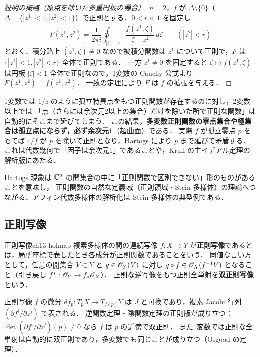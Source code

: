 \begin{proof}[証明の概略（原点を除いた多重円板の場合）]
$n=2$，$f$ が $\Delta\setminus\{0\}$（$\Delta=\{|z^1|<1,|z^2|<1\}$）で正則とする．$0<r<1$ を固定し
\begin{equation}
  F(z^1,z^2) = \frac{1}{2\pi i}\oint_{|\zeta|=r}\frac{f(z^1,\zeta)}{\zeta - z^2}\,d\zeta \qquad(|z^2|<r)
\end{equation}
とおく．積分路上 $(z^1,\zeta)\neq0$ なので被積分関数は $z^1$ について正則で，$F$ は $\{|z^1|<1,|z^2|<r\}$ 全体で正則である．
一方 $z^1\neq0$ を固定すると $\zeta\mapsto f(z^1,\zeta)$ は円板 $|\zeta|<1$ 全体で正則なので，1変数の Cauchy 公式より $F(z^1,z^2)=f(z^1,z^2)$．
一致の定理により $F$ は $f$ の拡張を与える．
\end{proof}

1変数では $1/z$ のように孤立特異点をもつ正則関数が存在するのに対し，2変数以上では
「点（さらには余次元2以上の集合）だけを除いた所で正則な関数」は自動的にそこまで延びてしまう．
この結果，\textbf{多変数正則関数の零点集合や極集合は孤立点にならず，必ず余次元1}（超曲面）である．
実際 $f$ が孤立零点 $p$ をもてば $1/f$ が $p$ を除いて正則となり，Hartogs により $p$ まで延びて矛盾する．
これは代数幾何で「因子は余次元1」であることや，Krull の主イデアル定理の解析版にあたる．

\begin{note}
Hartogs 現象は $\mathbb{C}^n$ の開集合の中に「正則関数で区別できない」形のものがあることを意味し，
正則関数の自然な定義域（正則領域・Stein 多様体）の理論へつながる．アフィン代数多様体の解析化は Stein 多様体の典型例である．
\end{note}

\subsection{正則写像}

\begin{mydef}{正則写像}{ch13-holmap}
複素多様体の間の連続写像 $f:X\to Y$ が\textbf{正則写像}であるとは，局所座標で表したとき各成分が正則関数であることをいう．
同値な言い方として，任意の開集合 $V\subset Y$ と $g\in\mathscr{O}_Y(V)$ に対し $g\circ f\in\mathscr{O}_X(f^{-1}V)$ となること（引き戻し $f^*:\mathscr{O}_Y\to f_*\mathscr{O}_X$）．
正則な逆写像をもつ正則全単射を\textbf{双正則写像}という．
\end{mydef}

正則写像 $f$ の微分 $df_p:T_pX\to T_{f(p)}Y$ は $J$ と可換であり，複素 Jacobi 行列 $(\partial f^i/\partial z^j)$ で表される．
逆関数定理・陰関数定理の正則版が成り立つ：$\det(\partial f^i/\partial z^j)(p)\neq0$ なら $f$ は $p$ の近傍で双正則．
また1変数では正則な全単射は自動的に双正則であり，多変数でも同じことが成り立つ（Osgood の定理）．

